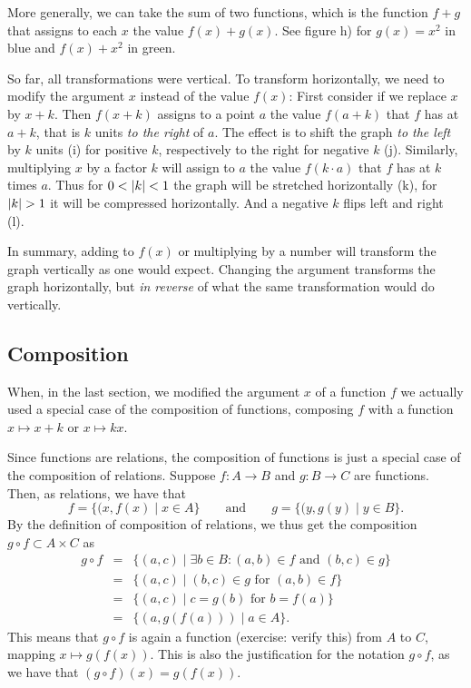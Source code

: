 More generally, we can take the sum of two functions, which is the function $f+g$ that
assigns to each $x$ the value $f(x)+g(x)$. See figure h) for $g(x)=x^2$ in blue and
$f(x)+x^2$ in green.
\medskip

So far, all transformations were vertical. To transform horizontally, we need to modify
the argument $x$ instead of the value $f(x)$:
First consider if we replace $x$ by $x+k$. Then $f(x+k)$ assigns to a point $a$ the
value $f(a+k)$ that $f$ has at $a+k$, that is $k$ units {\em to the right} of $a$.
The effect is to shift the
graph {\em to the left} by $k$ units (i) for positive $k$, respectively to the right for
negative $k$ (j).
Similarly, multiplying $x$ by a factor $k$ will assign to $a$ the value $f(k\cdot a)$
that $f$ has at $k$ times $a$. Thus for $0<\left|k\right|<1$ the graph will be stretched
horizontally (k), for $\sz{k}>1$ it will be compressed horizontally. And a negative $k$
flips left and right (l).
\medskip

In summary, adding to $f(x)$ or multiplying by a number will transform the graph
vertically as one would expect. Changing the argument transforms the graph horizontally,
but {\em in reverse} of what the same transformation would do vertically.

\subsection{Composition}
\label{secfunccomposition}

When, in the last section, we modified the argument $x$ of a function $f$ we actually
used a special case of the composition of functions, composing $f$ with a function
$x\mapsto x+k$ or $x\mapsto kx$.

Since functions are relations, the composition of functions is just a special case of
the composition of relations. Suppose $f\colon A\to B$ and $g\colon B\to C$ are
functions. Then, as relations, we have that
\[
f=\{(x,f(x)\mid x\in A\}
\qquad\mbox{and}\qquad
g=\{(y,g(y)\mid y\in B\}.
\]
By the definition of composition of relations, we thus get the composition $g\circ
f\subset A\times C$ as
\begin{eqnarray*}
g\circ f&=&\{(a,c)\mid \exists b\in B:(a,b)\in f \mbox{\ and\ }(b,c)\in g\}\\
&=&\{(a,c)\mid (b,c)\in g \mbox{\ for\ }(a,b)\in f\}\\
&=&\{(a,c)\mid c=g(b) \mbox{\ for\ }b=f(a)\}\\
&=&\{(a,g(f(a)))\mid a\in A\}.
\end{eqnarray*}
This means that $g\circ f$ is again a function (exercise: verify this) from
$A$ to $C$, mapping $x\mapsto g(f(x))$. This is also the justification for the notation
$g\circ f$, as we have that $(g\circ f)(x)=g(f(x))$.
\smallskip

